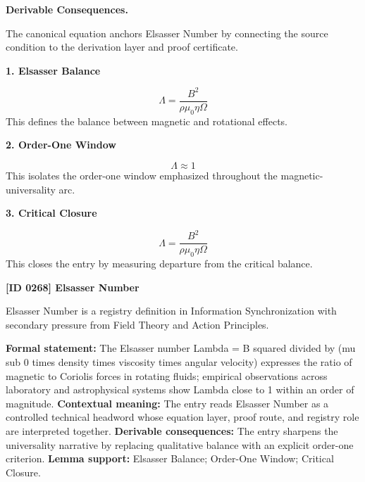 \par\vspace{0.35em}
\noindent\textbf{Derivable Consequences.}\quad
\begingroup
\footnotesize
\raggedright
The canonical equation anchors Elsasser Number by connecting the source condition to the derivation layer and proof certificate.
\par\endgroup

\noindent\textbf{1. Elsasser Balance}\par
\[
\Lambda=\frac{B^2}{\rho\mu_0\eta\Omega}
\]
\noindent This defines the balance between magnetic and rotational effects.\par
\noindent\textbf{2. Order-One Window}\par
\[
\Lambda\approx 1
\]
\noindent This isolates the order-one window emphasized throughout the magnetic-universality arc.\par
\noindent\textbf{3. Critical Closure}\par
\[
\Lambda=\frac{B^2}{\rho\mu_0\eta\Omega}
\]
\noindent This closes the entry by measuring departure from the critical balance.\par

\clearpage
\noindent\textbf{[ID 0268] Elsasser Number}\par
\vspace{0.35em}
\begingroup\small
{}
Elsasser Number is a registry definition in Information Synchronization with secondary pressure from Field Theory and Action Principles.

\begingroup\footnotesize\setlength{\emergencystretch}{3em}\sloppy
\textbf{Formal statement:} The Elsasser number Lambda = B squared divided by (mu sub 0 times density times viscosity times angular velocity) expresses the ratio of magnetic to Coriolis forces in rotating fluids; empirical observations across laboratory and astrophysical systems show Lambda close to 1 within an order of magnitude. \textbf{Contextual meaning:} The entry reads Elsasser Number as a controlled technical headword whose equation layer, proof route, and registry role are interpreted together. \textbf{Derivable consequences:} The entry sharpens the universality narrative by replacing qualitative balance with an explicit order-one criterion. \textbf{Lemma support:} Elsasser Balance; Order-One Window; Critical Closure.\par
\endgroup

